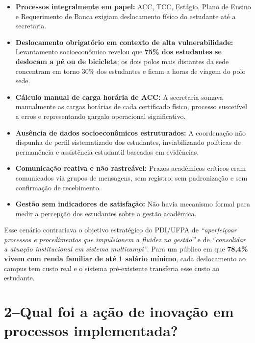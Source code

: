 \documentclass[12pt,a4paper]{article}
\begin{document}
\begin{itemize}[label={\color{ufpared}\faExclamationCircle}]
  \item \textbf{Processos integralmente em papel:} ACC, TCC, Estágio, Plano de Ensino e
    Requerimento de Banca exigiam deslocamento físico do estudante até a secretaria.

  \item \textbf{Deslocamento obrigatório em contexto de alta vulnerabilidade:} Levantamento
    socioeconômico revelou que \textbf{75\% dos estudantes se deslocam a pé ou de bicicleta};
    os dois polos mais distantes da sede concentram em torno 30\%
    dos estudantes e ficam a horas de viagem do polo sede.

  \item \textbf{Cálculo manual de carga horária de ACC:} A secretaria somava manualmente
    as cargas horárias de cada certificado físico, processo suscetível a erros e
    representando gargalo operacional significativo.

  \item \textbf{Ausência de dados socioeconômicos estruturados:} A coordenação não dispunha
    de perfil sistematizado dos estudantes, inviabilizando políticas de permanência e
    assistência estudantil baseadas em evidências.

  \item \textbf{Comunicação reativa e não rastreável:} Prazos acadêmicos críticos eram
    comunicados via grupos de mensagens, sem registro, sem padronização e sem confirmação de
    recebimento.

  \item \textbf{Gestão sem indicadores de satisfação:} Não havia mecanismo formal para
    medir a percepção dos estudantes sobre a gestão acadêmica.
\end{itemize}

Esse cenário contrariava o objetivo estratégico do PDI/UFPA de \textit{``aperfeiçoar
processos e procedimentos que impulsionem a fluidez na gestão''} e de \textit{``consolidar
a atuação institucional em sistema multicampi''}. Para um público em que \textbf{78,4\%
vivem com renda familiar de até 1 salário mínimo}, cada deslocamento ao campus tem custo
real e o sistema pré-existente transferia esse custo ao estudante.

\section{2\;–\;Qual foi a ação de inovação em processos implementada?}
\end{document}
